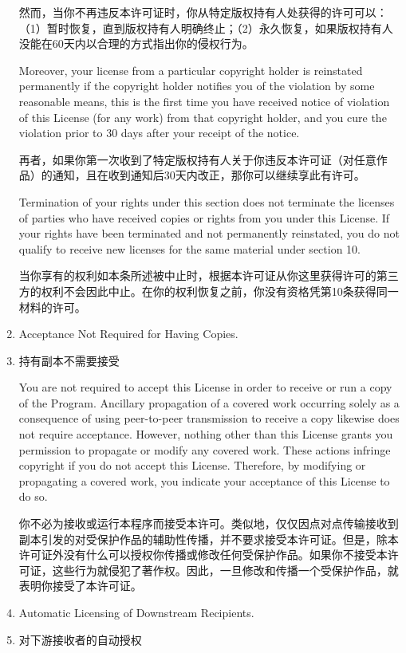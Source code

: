 \documentclass[11pt]{article}
\begin{document}
\begin{enumerate}
然而，当你不再违反本许可证时，你从特定版权持有人处获得的许可可以：（1）暂时恢复，直到版权持有人明确终止；（2）永久恢复，如果版权持有人没能在60天内以合理的方式指出你的侵权行为。

Moreover, your license from a particular copyright holder is
reinstated permanently if the copyright holder notifies you of the
violation by some reasonable means, this is the first time you have
received notice of violation of this License (for any work) from that
copyright holder, and you cure the violation prior to 30 days after
your receipt of the notice.

再者，如果你第一次收到了特定版权持有人关于你违反本许可证（对任意作品）的通知，且在收到通知后30天内改正，那你可以继续享此有许可。

Termination of your rights under this section does not terminate the
licenses of parties who have received copies or rights from you under
this License.  If your rights have been terminated and not permanently
reinstated, you do not qualify to receive new licenses for the same
material under section 10.

当你享有的权利如本条所述被中止时，根据本许可证从你这里获得许可的第三方的权利不会因此中止。在你的权利恢复之前，你没有资格凭第10条获得同一材料的许可。

\item Acceptance Not Required for Having Copies.
\item 持有副本不需要接受

You are not required to accept this License in order to receive or
run a copy of the Program.  Ancillary propagation of a covered work
occurring solely as a consequence of using peer-to-peer transmission
to receive a copy likewise does not require acceptance.  However,
nothing other than this License grants you permission to propagate or
modify any covered work.  These actions infringe copyright if you do
not accept this License.  Therefore, by modifying or propagating a
covered work, you indicate your acceptance of this License to do so.

你不必为接收或运行本程序而接受本许可。类似地，仅仅因点对点传输接收到副本引发的对受保护作品的辅助性传播，并不要求接受本许可证。但是，除本许可证外没有什么可以授权你传播或修改任何受保护作品。如果你不接受本许可证，这些行为就侵犯了著作权。因此，一旦修改和传播一个受保护作品，就表明你接受了本许可证。

\item Automatic Licensing of Downstream Recipients.
\item 对下游接收者的自动授权


\end{enumerate}
\end{document}

